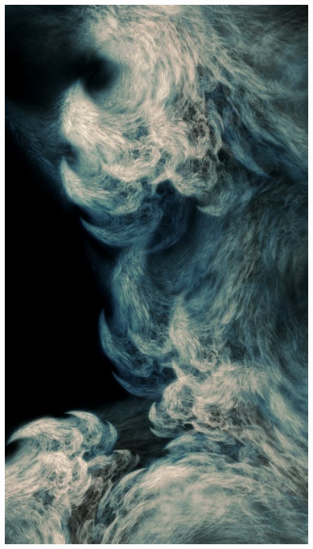 \documentclass[11pt,%
	fleqn,%
	a4paper,%
	twoside%
]{backagBook}
\begin{document}

\frontmatter
\titlepage%
    {\includegraphics[width=\paperwidth]{Images/peakpx.jpg}}%
\end{document}
